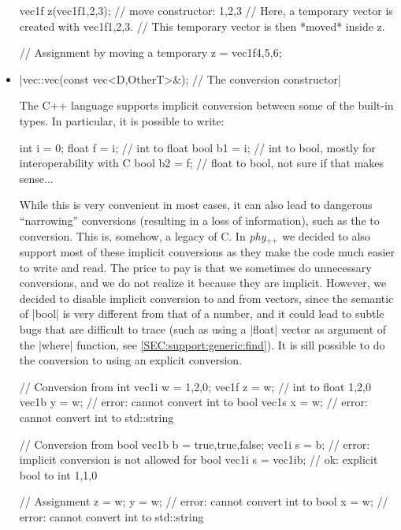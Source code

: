 \documentclass[12pt,a4paper]{report}
\newcommand{\phypp}{\textit{phy}$_{\text{++}}$\xspace}
\newenvironment{example}
{
    \begin{mdframed}[style=example,frametitle={Example}]
}
{
    \end{mdframed}
}
\newcommand{\cppbool}{\cppinline{bool}\xspace}
\begin{document}
\begin{itemize}
\begin{example}
\begin{cppcode}
vec1f z(vec1f{1,2,3}); // move constructor: {1,2,3}
// Here, a temporary vector is created with vec1f{1,2,3}.
// This temporary vector is then *moved* inside z.

// Assignment by moving a temporary
z = vec1f{4,5,6};
\end{cppcode}
\end{example}

\item \cppinline|vec::vec(const vec<D,OtherT>&); // The conversion constructor|

The C++ language supports implicit conversion between some of the built-in types. In particular, it is possible to write:
\begin{cppcode}
int i = 0;
float f = i; // int to float
bool b1 = i; // int to bool, mostly for interoperability with C
bool b2 = f; // float to bool, not sure if that makes sense...
\end{cppcode}
While this is very convenient in most cases, it can also lead to dangerous ``narrowing'' conversions (resulting in a loss of information), such as the  to \cppbool conversion. This is, somehow, a legacy of C. In \phypp we decided to also support most of these implicit conversions as they make the code much easier to write and read. The price to pay is that we sometimes do unnecessary conversions, and we do not realize it because they are implicit. However, we decided to disable implicit conversion to and from \cppbool vectors, since the semantic of \cppinline|bool| is very different from that of a number, and it could lead to subtle bugs that are difficult to trace (such as using a \cppinline|float| vector as argument of the \cppinline|where| function, see \ref{SEC:support:generic:find}). It is sill possible to do the conversion to \cppbool using an explicit conversion.

\begin{example}
\begin{cppcode}
// Conversion from int
vec1i w = {1,2,0};
vec1f z = w; // int to float {1,2,0}
vec1b y = w; // error: cannot convert int to bool
vec1s x = w; // error: cannot convert int to std::string

// Conversion from bool
vec1b b = {true,true,false};
vec1i s = b;        // error: implicit conversion is not allowed for bool
vec1i s = vec1i{b}; // ok: explicit bool to int {1,1,0}

// Assignment
z = w;
y = w;        // error: cannot convert int to bool
x = w;        // error: cannot convert int to std::string


\end{cppcode}
\end{example}
\end{itemize}
\end{document}

